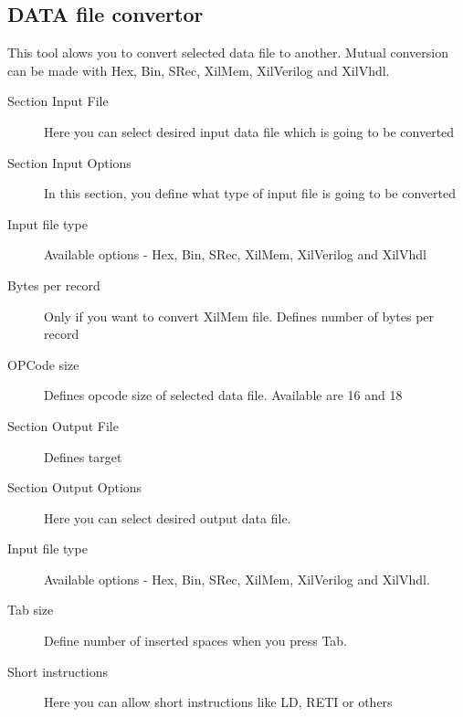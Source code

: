                 \subsection{DATA file convertor}
                    This tool alows you to convert selected data file to another. Mutual conversion can be made with
                    Hex, Bin, SRec, XilMem, XilVerilog and XilVhdl.
                    \begin{description}
                        \item[Section Input File] Here you can select desired input data file which is going to be converted
                        \item[Section Input Options] In this section, you define what type of input file is going to be converted
                        \item[Input file type] Available options - Hex, Bin, SRec, XilMem, XilVerilog and XilVhdl
                        \item[Bytes per record] Only if you want to convert XilMem file. Defines number of bytes per record
                        \item[OPCode size] Defines opcode size of selected data file. Available are 16 and 18
                        \item[Section Output File] Defines target
                        \item[Section Output Options] Here you can select desired output data file.
                        \item[Input file type] Available options - Hex, Bin, SRec, XilMem, XilVerilog and XilVhdl.
                        \item[Tab size]  Define number of inserted spaces when you press Tab.
                        \item[Short instructions] Here you can allow short instructions like LD, RETI or others
                    \end{description}

